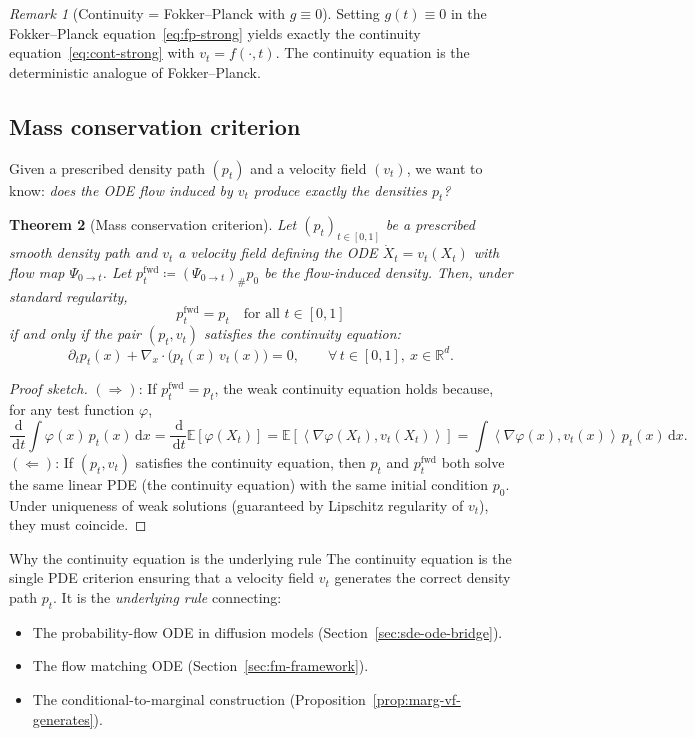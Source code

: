 \documentclass[11pt]{article}
\newcommand{\R}{\mathbb{R}}
\newcommand{\E}{\mathbb{E}}
\newcommand{\grad}{\nabla}
\newcommand{\inner}[2]{\left\langle #1,#2 \right\rangle}
\newcommand{\dd}{\,\mathrm{d}}
\newtheorem{theorem}{Theorem}[section]
\theoremstyle{definition}
\theoremstyle{remark}
\newtheorem{remark}[theorem]{Remark}
\begin{document}
\begin{remark}[Continuity = Fokker--Planck with $g\equiv 0$]
Setting $g(t)\equiv 0$ in the Fokker--Planck equation~\eqref{eq:fp-strong} yields exactly the continuity equation~\eqref{eq:cont-strong} with $v_t = f(\cdot,t)$.
The continuity equation is the deterministic analogue of Fokker--Planck.
\end{remark}

\subsection{Mass conservation criterion}\label{subsec:mass-conservation}

Given a prescribed density path $(p_t)$ and a velocity field $(v_t)$, we want to know: \emph{does the ODE flow induced by $v_t$ produce exactly the densities $p_t$?}

\begin{theorem}[Mass conservation criterion]\label{thm:mass-conservation}
Let $(p_t)_{t\in[0,1]}$ be a prescribed smooth density path and $v_t$ a velocity field defining the ODE $\dot{X}_t = v_t(X_t)$ with flow map $\Psi_{0\to t}$.
Let $p_t^{\mathrm{fwd}} \coloneqq (\Psi_{0\to t})_\# p_0$ be the flow-induced density.
Then, under standard regularity,
\[
p_t^{\mathrm{fwd}} = p_t \quad \text{for all } t\in[0,1]
\]
if and only if the pair $(p_t, v_t)$ satisfies the continuity equation:
\[
\partial_t p_t(x) + \grad_x\cdot\big(p_t(x)\,v_t(x)\big) = 0, \qquad \forall\,t\in[0,1],\ x\in\R^d.
\]
\end{theorem}

\begin{proof}[Proof sketch]
$(\Rightarrow)$: If $p_t^{\mathrm{fwd}} = p_t$, the weak continuity equation holds because, for any test function $\varphi$,
\[
\frac{\dd}{\dd t}\int \varphi(x)\,p_t(x)\dd x = \frac{\dd}{\dd t}\E[\varphi(X_t)] = \E[\inner{\grad\varphi(X_t)}{v_t(X_t)}] = \int \inner{\grad\varphi(x)}{v_t(x)}\,p_t(x)\dd x.
\]
$(\Leftarrow)$: If $(p_t,v_t)$ satisfies the continuity equation, then $p_t$ and $p_t^{\mathrm{fwd}}$ both solve the same linear PDE (the continuity equation) with the same initial condition $p_0$.
Under uniqueness of weak solutions (guaranteed by Lipschitz regularity of $v_t$), they must coincide.
\end{proof}

\begin{keybox}{Why the continuity equation is the underlying rule}
The continuity equation is the single PDE criterion ensuring that a velocity field $v_t$ generates the correct density path $p_t$.
It is the \emph{underlying rule} connecting:
\begin{itemize}[nosep]
\item The probability-flow ODE in diffusion models (Section~\ref{sec:sde-ode-bridge}).
\item The flow matching ODE (Section~\ref{sec:fm-framework}).
\item The conditional-to-marginal construction (Proposition~\ref{prop:marg-vf-generates}).
\end{itemize}
\end{keybox}
\end{document}

